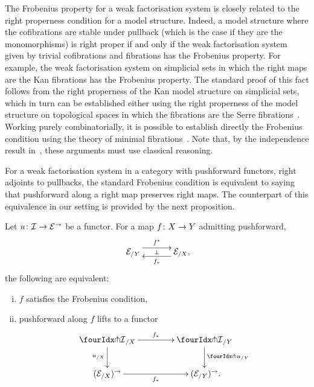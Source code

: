 \documentclass[reqno,10pt,a4paper,oneside]{amsart}
\begin{document}
\begin{remark}
The Frobenius property for a weak factorisation system is closely related to the right properness condition for a model structure.
Indeed, a model structure where the cofibrations are stable under pullback (which is the case if they are the monomorphisms) is right proper if and only if the weak factorisation system given by trivial cofibrations and fibrations has the Frobenius property.
For example, the weak factorisation system on simplicial sets in which the right maps are the Kan fibrations has the Frobenius property.
The standard proof of this fact follows from the right properness of the Kan model structure on simplicial sets, which in turn can be established either using the right properness of the model structure on topological spaces in which the fibrations are the Serre fibrations~\cite[Theorem~13.1.13]{hirschhorn-model-localizations}.
Working purely combinatorially, it is possible to establish directly the Frobenius condition using the theory of minimal fibrations~\cite[Theorem~1.7.1]{joyal-tierney-notes}.
Note that, by the independence result in~\cite{coquand-non-constructivity-kan}, these arguments must use classical reasoning.
\end{remark}

\medskip

For a weak factorisation system in a category with pushforward functors, \ie right adjoints to pullbacks, the standard Frobenius condition is equivalent to saying that pushforward along a right map preserves right maps.
The counterpart of this equivalence in our setting is provided by the next proposition.



\begin{proposition} \label{lift-dependent-product}
Let $u \colon \mathcal{I} \to \mathcal{E}^\to$ be a functor.
For a map $f \colon X \to Y$ admitting pushforward,
\[
\xymatrix@C+1em{
  \catE_{/Y}
  \ar@<5pt>[r]^{f^*}
  \ar@{}[r]|{\bot}
&
  \catE_{/X}
  \ar@<5pt>[l]^{f_*} \rlap{,}
}
\]
the following are equivalent:
\begin{enumerate}[(i)]
\item $f$ satisfies the Frobenius condition,
\item pushforward along $f$ lifts to a functor
\[
\xymatrix@C=1.5cm{
  {\liftr{\cal{I}}}_{/X}
  \ar[r]^{f_*}
  \ar[d]_{u_{/X}}
&
  {\liftr{\cal{I}}}_{/Y}
  \ar[d]^{{\liftr{u}}_{/Y}}
\\
  (\catE_{/X})^\to
  \ar[r]_{f_*}
&
  (\catE_{/Y})^\to \rlap{.}
}
\]

\end{enumerate}
\end{proposition}
\end{document}

